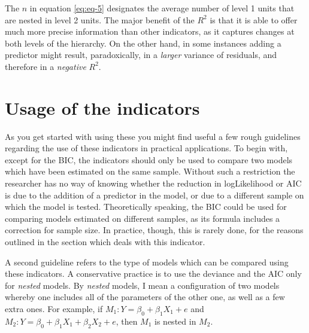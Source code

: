\documentclass[12pt,english]{article}\usepackage[]{graphicx}\usepackage[usenames, dvipsnames]{xcolor}
\begin{document}
The $n$ in equation \ref{eq:eq-5} designates the average number of level 1 units that are nested in level 2 units. The major benefit of the $R^2$ is that it is able to offer much more precise information than other indicators, as it captures changes at both levels of the hierarchy. On the other hand, in some instances adding a predictor might result, paradoxically, in a \textit{larger} variance of residuals, and therefore in a \textit{negative} $R^2$.




\section{Usage of the indicators}
As you get started with using these you might find useful a few rough guidelines regarding the use of these indicators in practical applications. To begin with, except for the BIC, the indicators should only be used to compare two models which have been estimated on the same sample. Without such a restriction the researcher has no way of knowing whether the reduction in logLikelihood or AIC is due to the addition of a predictor in the model, or due to a different sample on which the model is tested. Theoretically speaking, the BIC could be used for comparing models estimated on different samples, as its formula includes a correction for sample size. In practice, though, this is rarely done, for the reasons outlined in the section which deals with this indicator.

A second guideline refers to the type of models which can be compared using these indicators. A conservative practice is to use the deviance and the AIC only for \textit{nested} models. By \textit{nested} models, I mean a configuration of two models whereby one includes all of the parameters of the other one, as well as a few extra ones. For example, if $M_1: Y=\beta_0+\beta_1X_1+e$ and $M_2: Y=\beta_0+\beta_1X_1+\beta_2X_2+e$, then $M_1$ is nested in $M_2$.
\end{document}
